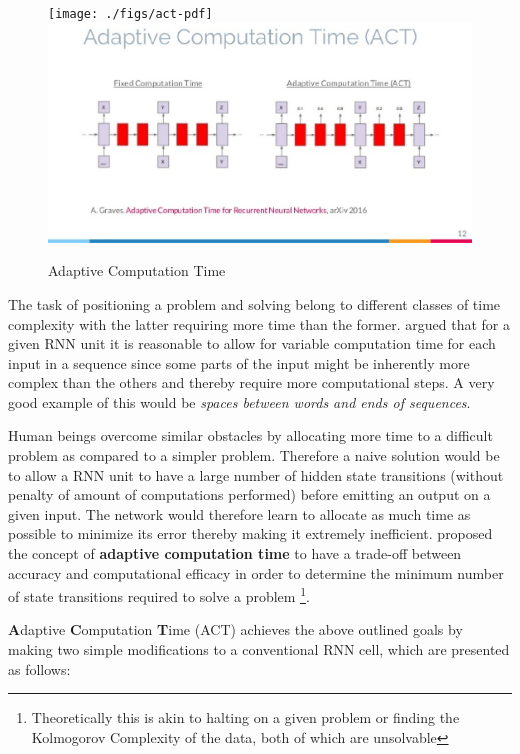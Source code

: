 \begin{figure}
	\begin{minipage}[t]{\textwidth}
		\ifpdf
		\texttt{[image: ./figs/act-pdf]}
		\else
		\includegraphics[width=\linewidth,keepaspectratio=true]{./figs/act-eps}
		\fi
		\caption{\small Adaptive Computation Time}
		\label{mtv:ponder}
	\end{minipage}
\end{figure}

The task of positioning a problem and solving belong to different classes of time complexity with the latter requiring more time than the former. \cite{Graves2016} argued that for a given RNN unit it is reasonable to allow for variable computation time for each input in a sequence since some parts of the input might be inherently more complex than the others and thereby require more computational steps. A very good example of this would be \textit{spaces between words and ends of sequences}. 

Human beings overcome similar obstacles by allocating more time to a difficult problem as compared to a simpler problem. Therefore a naive solution would be to allow a RNN unit to have a large number of hidden state transitions (without penalty of amount of computations performed) before emitting an output on a given input. The network would therefore learn to allocate as much time as possible to minimize its error thereby making it extremely inefficient. \cite{Graves2016} proposed the concept of \textbf{adaptive computation time} to have a trade-off between accuracy and computational efficacy in order to determine the minimum number of state transitions required to solve a problem \footnote{Theoretically this is akin to halting on a given problem or finding the Kolmogorov Complexity of the data, both of which are unsolvable}.

\textbf{A}daptive \textbf{C}omputation \textbf{T}ime (ACT) achieves the above outlined goals by making two simple modifications to a conventional RNN cell, which are presented as follows:

